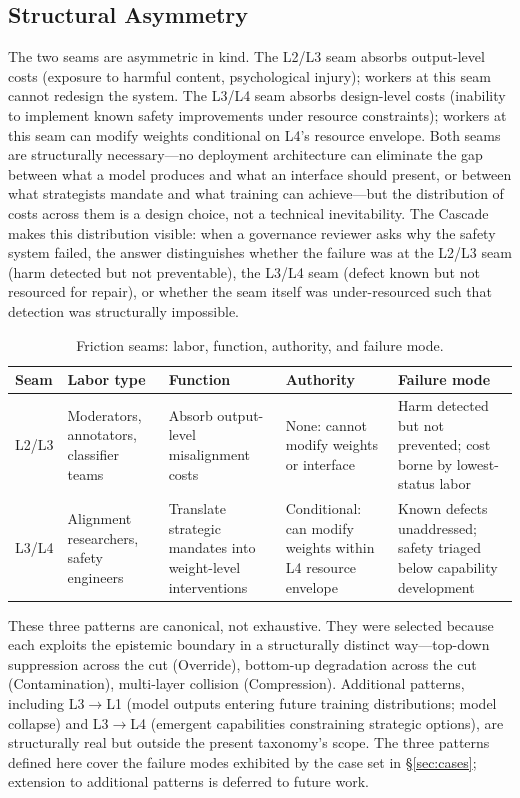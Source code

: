 \documentclass[11pt]{article}
\begin{document}
\subsection{Structural Asymmetry}

The two seams are asymmetric in kind. The L2/L3 seam absorbs output-level costs (exposure to harmful content, psychological injury); workers at this seam cannot redesign the system. The L3/L4 seam absorbs design-level costs (inability to implement known safety improvements under resource constraints); workers at this seam can modify weights conditional on L4's resource envelope. Both seams are structurally necessary---no deployment architecture can eliminate the gap between what a model produces and what an interface should present, or between what strategists mandate and what training can achieve---but the distribution of costs across them is a design choice, not a technical inevitability. The Cascade makes this distribution visible: when a governance reviewer asks why the safety system failed, the answer distinguishes whether the failure was at the L2/L3 seam (harm detected but not preventable), the L3/L4 seam (defect known but not resourced for repair), or whether the seam itself was under-resourced such that detection was structurally impossible.

\begin{table}[!htbp]
\centering
\small
\caption{Friction seams: labor, function, authority, and failure mode.}
\label{tab:seams}
{\setlength{\tabcolsep}{4pt}
\begin{tabularx}{\columnwidth}{@{}l l Y Y Y@{}}
\toprule
\textbf{Seam} & \textbf{Labor type} & \textbf{Function} & \textbf{Authority} & \textbf{Failure mode} \\
\midrule
L2/L3 & Moderators, annotators, classifier teams & Absorb output-level misalignment costs & None: cannot modify weights or interface & Harm detected but not prevented; cost borne by lowest-status labor \\
L3/L4 & Alignment researchers, safety engineers & Translate strategic mandates into weight-level interventions & Conditional: can modify weights within L4 resource envelope & Known defects unaddressed; safety triaged below capability development \\
\bottomrule
\end{tabularx}}
\end{table}

These three patterns are canonical, not exhaustive. They were selected because each exploits the epistemic boundary in a structurally distinct way---top-down suppression across the cut (Override), bottom-up degradation across the cut (Contamination), multi-layer collision (Compression). Additional patterns, including L3$\to$L1 (model outputs entering future training distributions; model collapse) and L3$\to$L4 (emergent capabilities constraining strategic options), are structurally real but outside the present taxonomy's scope. The three patterns defined here cover the failure modes exhibited by the case set in \S\ref{sec:cases}; extension to additional patterns is deferred to future work.
\end{document}
